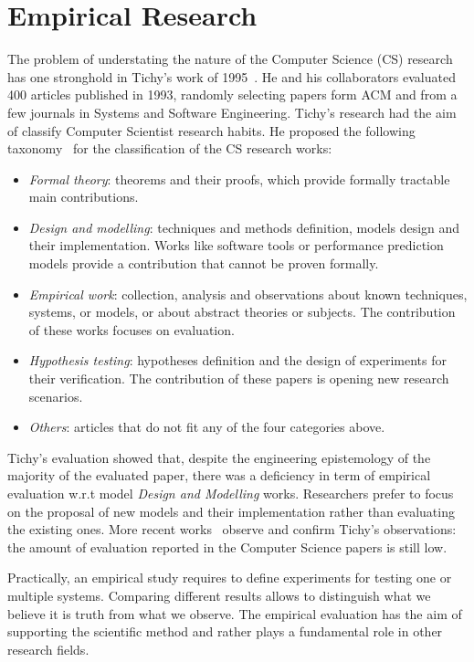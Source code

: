 \pagebreak

\section{Empirical Research}\label{sec:empirical-research}

The problem of understating the nature of the Computer Science (CS) research has one stronghold in Tichy's work of 1995~\cite{Tichy:1995:EEC:209090.209093}. He and his collaborators evaluated 400 articles published in 1993, randomly selecting papers form ACM and from a few journals in Systems and Software Engineering. Tichy's research had the aim of classify Computer Scientist research habits. He proposed the following taxonomy~\cite{Tichy:1995:EEC:209090.209093} for the classification of the CS research works:
\begin{itemize}
\item \textit{Formal theory}: theorems and their proofs, which provide formally tractable main contributions. 
\item \textit{Design and modelling}:  techniques and methods definition, models design and their implementation. Works like  software tools or performance prediction models provide a contribution that cannot be proven formally.
\item \textit{Empirical work}: collection, analysis and observations about known techniques, systems, or models, or about abstract theories or subjects. The contribution of these works focuses on evaluation.
\item \textit{Hypothesis testing}: hypotheses definition and the design of experiments for their verification. The contribution of these papers is opening new research scenarios.
\item \textit{Others}: articles that do not fit any of the four categories above.
\end{itemize}

Tichy's evaluation showed that, despite the engineering epistemology of the majority of the evaluated paper, there was a deficiency in term of empirical evaluation w.r.t model \textit{Design and Modelling} works. Researchers prefer to focus on the proposal of new models and their implementation rather than evaluating the existing ones. More recent works~\cite{Wainer:2009:EEC:1518331.1518552} observe and confirm Tichy's observations: the amount of evaluation reported in the Computer Science papers is still low.

Practically, an empirical study requires to define experiments for testing one or multiple systems. Comparing different results allows to distinguish what we believe it is truth from what we observe. The empirical evaluation has the aim of supporting the scientific method and rather plays a fundamental role in other research fields.

